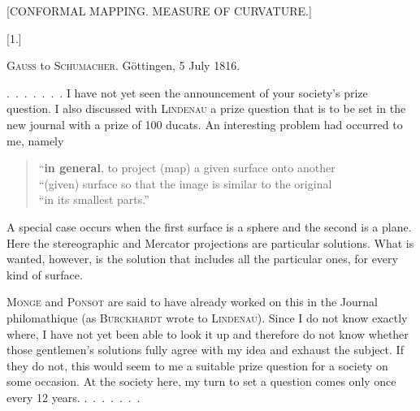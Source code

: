 \clearpage
{}%
\begin{center}\large [CONFORMAL MAPPING. MEASURE OF CURVATURE.]\end{center}
\begin{center}[1.]\end{center}
\begin{center}\textsc{Gauss} to \textsc{Schumacher}. Göttingen, 5 July 1816.\end{center}

\mbox{. . . . . . .} I have not yet seen the announcement of your society’s prize question. I also discussed with \textsc{Lindenau} a prize question that is to be set in the new journal with a prize of 100 ducats. An interesting problem had occurred to me, namely
\begin{quote}
\noindent “\textbf{in general}, to project (map) a given surface onto another\\
“(given) surface so that the image is similar to the original\\
“in its smallest parts.”
\end{quote}

A special case occurs when the first surface is a sphere and the second is a plane. Here the stereographic and Mercator projections are particular solutions. What is wanted, however, is the  solution that includes all the particular ones, for every kind of surface.

\textsc{Monge} and \textsc{Ponsot} are said to have already worked on this in the Journal philomathique (as \textsc{Burckhardt} wrote to \textsc{Lindenau}). Since I do not know exactly where, I have not yet been able to look it up and therefore do not know whether those gentlemen’s solutions fully agree with my idea and exhaust the subject. If they do not, this would seem to me a suitable prize question for a society on some occasion. At the society here, my turn to set a question comes only once every 12 years. \mbox{. . . . . . .}
